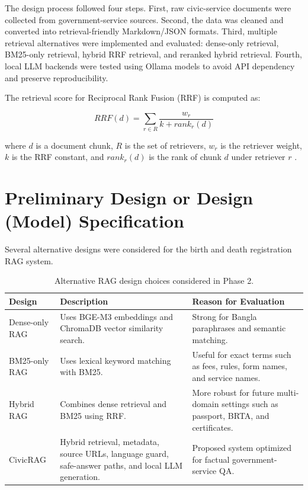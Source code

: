 The design process followed four steps. First, raw civic-service documents were collected from government-service sources. Second, the data was cleaned and converted into retrieval-friendly Markdown/JSON formats. Third, multiple retrieval alternatives were implemented and evaluated: dense-only retrieval, BM25-only retrieval, hybrid RRF retrieval, and reranked hybrid retrieval. Fourth, local LLM backends were tested using Ollama models to avoid API dependency and preserve reproducibility.

The retrieval score for Reciprocal Rank Fusion (RRF) is computed as:

\begin{equation}
RRF(d) = \sum_{r \in R} \frac{w_r}{k + rank_r(d)}
\end{equation}

where $d$ is a document chunk, $R$ is the set of retrievers, $w_r$ is the retriever weight, $k$ is the RRF constant, and $rank_r(d)$ is the rank of chunk $d$ under retriever $r$ \cite{cormack2009rrf}.

\section{Preliminary Design or Design (Model) Specification}

Several alternative designs were considered for the birth and death registration RAG system.

\begin{table}[h]
\centering
\caption{Alternative RAG design choices considered in Phase 2.}
\begin{tabularx}{\textwidth}{p{3cm} X X}
\toprule
\textbf{Design} & \textbf{Description} & \textbf{Reason for Evaluation} \\
\midrule
Dense-only RAG & Uses BGE-M3 embeddings and ChromaDB vector similarity search. & Strong for Bangla paraphrases and semantic matching. \\
BM25-only RAG & Uses lexical keyword matching with BM25. & Useful for exact terms such as fees, rules, form names, and service names. \\
Hybrid RAG & Combines dense retrieval and BM25 using RRF. & More robust for future multi-domain settings such as passport, BRTA, and certificates. \\
CivicRAG & Hybrid retrieval, metadata, source URLs, language guard, safe-answer paths, and local LLM generation. & Proposed system optimized for factual government-service QA. \\
\bottomrule
\end{tabularx}
\end{table}

